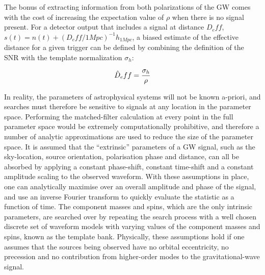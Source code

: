\documentclass[binding=0.6cm, LaM]{sapthesis}
\begin{document}
	The bonus of extracting information from both polarizations of the GW 
	comes with the cost of increasing the expectation value of $\rho$ when there is no signal present. 
	For a detector output that includes a signal at distance $D_eff$, 
	$s(t) = n(t) + (D_eff/1 Mpc)^{-1}h_{1Mpc}$, 
	a biased estimate of the effective distance for a given trigger 
	can be defined by combining the definition of the SNR with the template normalization $\sigma_h$:

		\begin{equation}
			\hat D_eff = {{\sigma_h} \over {\rho}}
		\end{equation}

	In reality, the parameters of astrophysical systems will not be known a-priori, 
	and searches must therefore be sensitive to signals at any location in the parameter space. 
	Performing the matched-filter calculation at every point in the full parameter space 
	would be extremely computationally prohibitive, 
	and therefore a number of analytic approximations are used to reduce the size of the parameter space. 
	It is assumed that the “extrinsic” parameters of a GW signal, 
	such as the sky-location, source orientation, polarisation phase and distance, 
	can all be absorbed by applying a constant phase-shift, 
	constant time-shift and a constant amplitude scaling to the observed waveform. 
	With these assumptions in place, 
	one can analytically maximise over an overall amplitude and phase of the signal, 
	and use an inverse Fourier transform to quickly evaluate the statistic as a function of time. 
	The component masses and spins, 
	which are the only intrinsic parameters, 
	are searched over by repeating the search process with a well chosen discrete set of waveform models 
	with varying values of the component masses and spins, 
	known as the template bank. 
	Physically, these assumptions hold if one assumes that the sources being observed 
	have no orbital eccentricity, no precession and no contribution from higher-order modes 
	to the gravitational-wave signal. 
\end{document}
